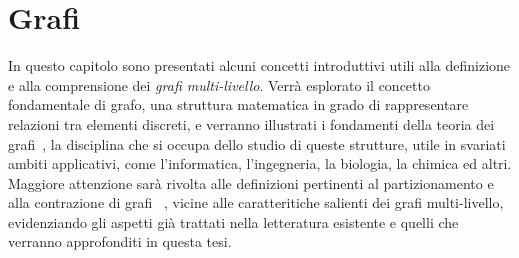 \chapter{Grafi}\label{cap:grafi-e-approccio-multi-livello}

In questo capitolo sono presentati alcuni concetti introduttivi utili alla definizione e alla comprensione dei
\textit{grafi multi-livello}.
Verr\`a esplorato il concetto fondamentale di grafo, una struttura matematica in grado di rappresentare relazioni tra
elementi discreti, e verranno illustrati i fondamenti della teoria dei grafi~\cite{cormen2010introduction,gross2018graph},
la disciplina che si occupa dello studio di queste strutture, utile in svariati ambiti applicativi, come l'informatica,
l'ingegneria, la biologia, la chimica ed altri.
Maggiore attenzione sar\`a rivolta alle definizioni pertinenti al partizionamento e alla contrazione di
grafi ~\cite{Sanders2012HighQG}, vicine alle caratteritiche salienti dei grafi multi-livello,
evidenziando gli aspetti gi\`a trattati nella letteratura esistente e quelli che verranno approfonditi in questa tesi.









